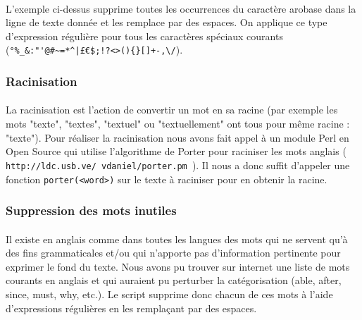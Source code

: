 \paragraph{}
L'exemple ci-dessus supprime toutes les occurrences du caractère arobase dans la ligne de texte donnée et les remplace par des espaces. On applique ce type d'expression régulière pour tous les caractères spéciaux courants\\ (\verb.°%_&:"'@#~=*^|£€$;!?<>(){}[]+-,\/.).

\subsubsection{Racinisation}
\paragraph{}
La racinisation est l'action de convertir un mot en sa racine (par exemple les mots "texte", "textes", "textuel" ou "textuellement" ont tous pour même racine : "texte"). Pour réaliser la racinisation nous avons fait appel à un module Perl en Open Source qui utilise l'algorithme de Porter pour raciniser les mots anglais (\texttt{ http://ldc.usb.ve/~vdaniel/porter.pm }). Il nous a donc suffit d'appeler une fonction \texttt{porter(<word>)} sur le texte à raciniser pour en obtenir la racine.

\subsubsection{Suppression des mots inutiles}
\paragraph{}
Il existe en anglais comme dans toutes les langues des mots qui ne servent qu'à des fins grammaticales et/ou qui n'apporte pas d'information pertinente pour exprimer le fond du texte. Nous avons pu trouver sur internet une liste de mots courants en anglais et qui auraient pu perturber la catégorisation (able, after, since, must, why, etc.). Le script supprime donc chacun de ces mots à l'aide d'expressions régulières en les remplaçant par des espaces.